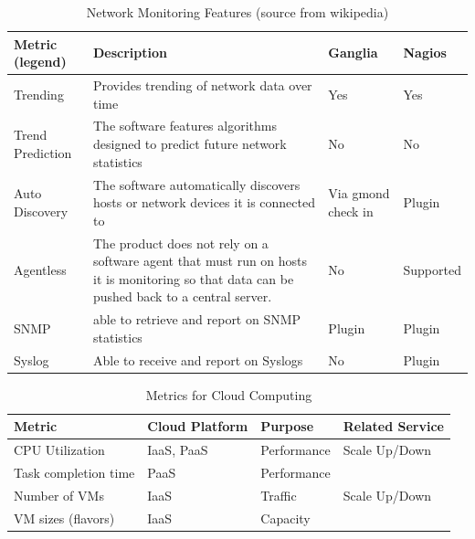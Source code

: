 \documentclass{sig-alternate-05-2015}
\begin{document}
\begin{table}[htb]
\caption{Network Monitoring Features (source from wikipedia)}
\begin{scriptsize}
\label{T:NMmetrics}
\bigskip
\begin{center}
\begin{tabular}{p{}p{}p{}p{}}
Metric (legend) & Description & Ganglia & Nagios \\
\hline
Trending &
Provides trending of network data over time &
Yes &
Yes \\
\hline
Trend Prediction &
The software features algorithms designed to predict future network statistics &
No &
No \\
\hline
Auto Discovery &
The software automatically discovers hosts or network devices it is connected to &
Via gmond check in &
Plugin \\
\hline
Agentless & 
The product does not rely on a software agent that must run on hosts it is monitoring so that data can be pushed back to a central server. &
No &
Supported \\
\hline
SNMP &
able to retrieve and report on SNMP statistics &
Plugin &
Plugin \\
\hline
Syslog &
Able to receive and report on Syslogs &
No &
Plugin\\
\hline
\end{tabular}
\end{center}
\end{scriptsize}
\end{table}


\begin{table}[htb]
\caption{Metrics for Cloud Computing}
\begin{scriptsize}
\label{T:NMmetrics}
\bigskip
\begin{center}
\begin{tabular}{llll}
Metric & Cloud Platform & Purpose & Related Service \\
\hline
CPU Utilization &
IaaS, PaaS &
Performance &
Scale Up/Down \\
\hline
Task completion time &
PaaS &
Performance &
\\
\hline
Number of VMs &
IaaS &
Traffic &
Scale Up/Down \\
\hline
VM sizes (flavors) &
IaaS &
Capacity &
\\
\hline
\end{tabular}
\end{center}
\end{scriptsize}
\end{table}
\cite{aceto2013cloud}
\end{document}
